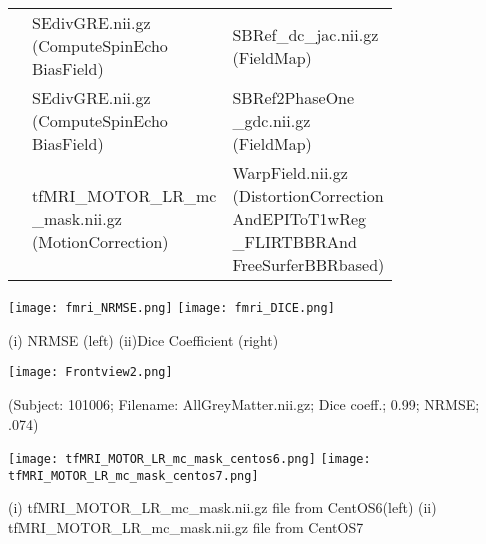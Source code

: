 \begin{center}
\begin{longtable}{|p{}|p{}|p{}|}
& \makecell[l]{SEdivGRE.nii.gz\\(ComputeSpinEcho\\BiasField)}                         & \makecell[l]{SBRef\_dc\_jac.nii.gz\\(FieldMap)} \\\cline{2-3}
& \makecell[l]{SEdivGRE.nii.gz\\(ComputeSpinEcho\\BiasField)}                         & \makecell[l]{SBRef2PhaseOne\\\_gdc.nii.gz\\(FieldMap)} \\\cline{2-3}
& \makecell[l]{tfMRI\_MOTOR\_LR\_mc\\\_mask.nii.gz\\(MotionCorrection)}               & \makecell[l]{WarpField.nii.gz\\(DistortionCorrection\\AndEPIToT1wReg\\\_FLIRTBBRAnd\\FreeSurferBBRbased)} \\\cline{1-3}
\end{longtable}
\label{tab:fMRIVolume_comparison_table}
\end{center}
\hfill \break

\begin{center}
\texttt{[image: fmri\_NRMSE.png]}%
\texttt{[image: fmri\_DICE.png]}
\caption*{(i) NRMSE (left) (ii)Dice Coefficient (right)}
\label{fig:fMRI_metric_values}
\end{center}

\hfill \break
\begin{center}
\texttt{[image: Frontview2.png]}%
\caption*{(Subject: 101006; Filename: AllGreyMatter.nii.gz; Dice coeff.; 0.99; NRMSE; .074)}
\label{fig:allgrey_matter} 
\end{center}

\begin{center}
\texttt{[image: tfMRI\_MOTOR\_LR\_mc\_mask\_centos6.png]}%
\texttt{[image: tfMRI\_MOTOR\_LR\_mc\_mask\_centos7.png]}
\caption*{(i) tfMRI\_MOTOR\_LR\_mc\_mask.nii.gz file from CentOS6(left) (ii) tfMRI\_MOTOR\_LR\_mc\_mask.nii.gz file from CentOS7}
\label{fig:tfMRI_mask_file}
\end{center}

